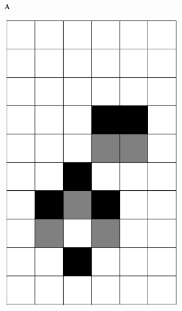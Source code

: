 \documentclass[12pt]{article}
\numberwithin{figure}{section} %
\begin{document}
\begin{figure}[H]
	\color{blue}
	\begin{subfigure}[t]{0.03\textwidth}
    		\textbf{A}
  	\end{subfigure}
 	\begin{subfigure}{0.3\textwidth}
     		\centering
     		\includegraphics[angle=270,width=\linewidth]{Section4/3.0}
     		\subcaption{}
   	\end{subfigure}
     	\begin{subfigure}{0.3\textwidth}
     		\centering

\end{subfigure}
\end{figure}
\end{document}
